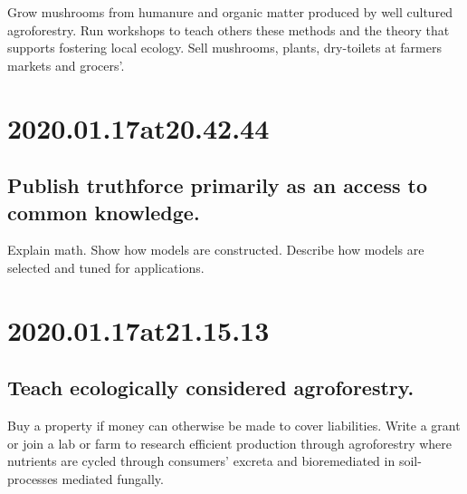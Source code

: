 Grow mushrooms from humanure and organic matter produced by well cultured agroforestry.
Run workshops to teach others these methods and the theory that supports fostering local ecology.
Sell mushrooms, plants, dry-toilets at farmers markets and grocers'.

\section*{ 2020.01.17at20.42.44 }
\subsection*{ Publish truthforce primarily as an access to common knowledge. }
Explain math.
Show how models are constructed.
Describe how models are selected and tuned for applications.

\section*{ 2020.01.17at21.15.13 }
\subsection*{ Teach ecologically considered agroforestry. }
Buy a property if money can otherwise be made to cover liabilities.
Write a grant or join a lab or farm to research efficient production through agroforestry where nutrients are cycled through consumers' excreta and bioremediated in soil-processes mediated fungally.
